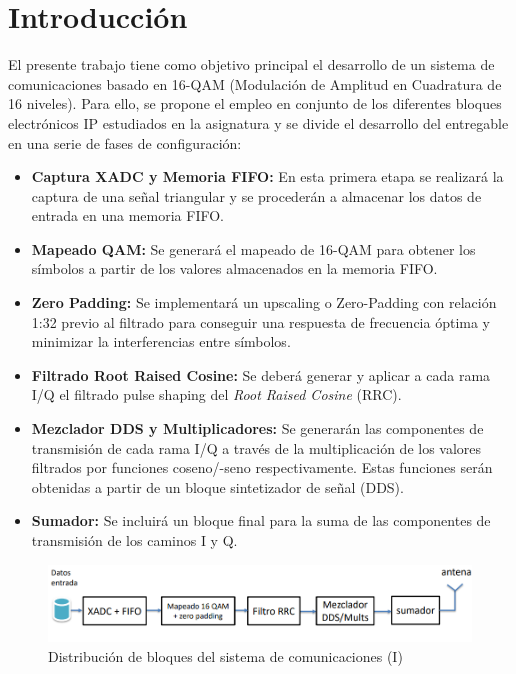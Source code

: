 \chapter{Introducción}
\label{section:intro}

El presente trabajo tiene como objetivo principal el desarrollo de un sistema de comunicaciones basado en 16-QAM (Modulación de Amplitud en Cuadratura de 16 niveles). Para ello, se propone el empleo en conjunto de los diferentes bloques electrónicos IP estudiados en la asignatura y se divide el desarrollo del entregable en una serie de fases de configuración:

\vspace{2mm}

\begin{itemize}
    \item \textbf{Captura XADC y Memoria FIFO:} En esta primera etapa se realizará la captura de una señal triangular y se procederán a almacenar los datos de entrada en una memoria FIFO.
    \item \textbf{Mapeado QAM: } Se generará el mapeado de 16-QAM para obtener los símbolos a partir de los valores almacenados en la memoria FIFO. 
    \item \textbf{Zero Padding: } Se implementará un upscaling o Zero-Padding con relación 1:32 previo al filtrado para conseguir una respuesta de frecuencia óptima y minimizar la interferencias entre símbolos.
    \item \textbf{Filtrado Root Raised Cosine: } Se deberá generar y aplicar a cada rama I/Q el filtrado pulse shaping del \textit{Root Raised Cosine} (RRC).
    \item \textbf{Mezclador DDS y Multiplicadores: } Se generarán las componentes de transmisión de cada rama I/Q a través de la multiplicación de los valores filtrados por funciones coseno/-seno respectivamente. Estas funciones serán obtenidas a partir de un bloque sintetizador de señal (DDS).
    \item \textbf{Sumador: } Se incluirá un bloque final para la suma de las componentes de transmisión de los caminos I y Q.   
\end{itemize}

\vspace{3mm}

\begin{figure}[h]
    \centering
    \includegraphics[width=1\textwidth]{img/diseno/sistema.PNG}
    \caption{Distribución de bloques del sistema de comunicaciones (I)}
    \label{fig:sistema}
\end{figure}
    
